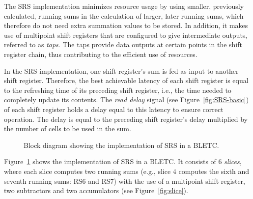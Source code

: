 \documentclass{llncs}
\begin{document}
The SRS implementation minimizes resource usage by using smaller, previously calculated, running sums in the calculation of larger, later running sums, which therefore do not need extra summation values to be stored.
In addition, it makes use of multipoint shift registers that are configured to give intermediate outputs, referred to as \emph{taps}.
The taps provide data outputs at certain points in the shift register chain, thus contributing to the efficient use of resources.

In the SRS implementation, one shift register's sum is fed as input to another shift register.
Therefore, the best achievable latency of each shift register is equal to the refreshing time of its preceding shift register, i.e., the time needed to completely update its contents.
The \emph{read delay} signal (see Figure~\ref{fig:SRS-basic}) of each shift register holds a delay equal to this latency to ensure correct operation.
The delay is equal to the preceding shift register's delay multiplied by the number of cells to be used in the sum.

\begin{figure}[t]
  \centering {}
   \caption{Block diagram showing the implementation of SRS in a BLETC.}
  \label{fig:srs}
\end{figure}

Figure~\ref{fig:srs} shows the implementation of SRS in a BLETC.
It consists of 6 \emph{slices}, where each slice computes two running sums (e.g., slice 4 computes the sixth and seventh running sums: RS6 and RS7) with the use of a multipoint shift register, two subtractors and two accumulators (see Figure~\ref{fig:slice}).
\end{document}
